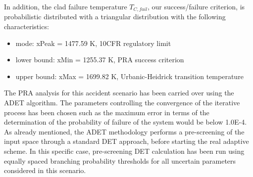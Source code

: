 In addition, the clad failure temperature $T_{C,fail}$, our success/failure criterion, is probabilistic distributed with a triangular distribution with the following characteristics:
\begin{itemize}
\item mode: xPeak = 1477.59 K, 10CFR regulatory limit
\item lower bound: xMin = 1255.37 K, PRA success criterion
\item upper bound: xMax = 1699.82 K, Urbanic-Heidrick transition temperature ~\cite{Urbanic1978}
\end{itemize}

The PRA analysis for this accident scenario has been carried over using the ADET algorithm. The parameters controlling the convergence of the iterative process has been chosen such as the maximum error in terms of the determination of the probability of failure of the system would be below 1.0E-4.
\\ As already mentioned, the ADET methodology performs a pre-screening of the input space through a standard DET approach, before starting the real adaptive scheme. In this specific case, pre-screening DET calculation has been run using equally spaced branching probability thresholds for all uncertain parameters considered in this scenario.

